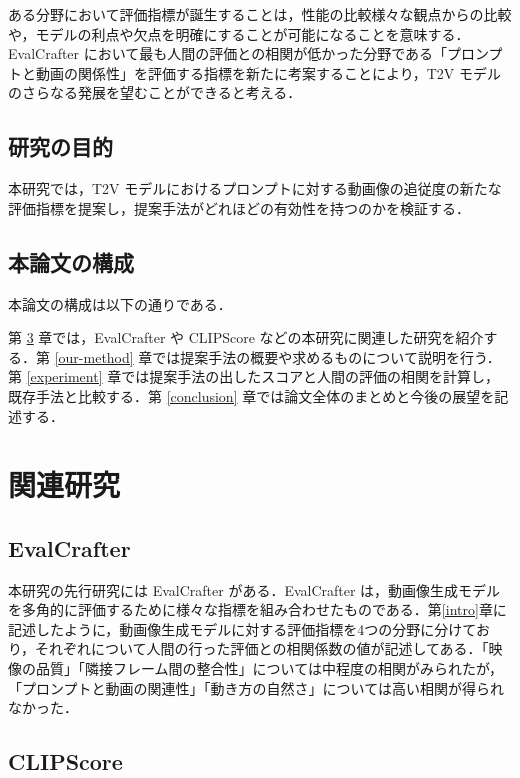 \documentclass[11pt,a4j]{jreport}
\begin{document}
ある分野において評価指標が誕生することは，性能の比較様々な観点からの比較や，モデルの利点や欠点を明確にすることが可能になることを意味する．EvalCrafter において最も人間の評価との相関が低かった分野である「プロンプトと動画の関係性」を評価する指標を新たに考案することにより，T2V モデルのさらなる発展を望むことができると考える．

\section{研究の目的}

本研究では，T2V モデルにおけるプロンプトに対する動画像の追従度の新たな評価指標を提案し，提案手法がどれほどの有効性を持つのかを検証する．

\section{本論文の構成}
本論文の構成は以下の通りである．

第 \ref{related-works} 章では，EvalCrafter や CLIPScore などの本研究に関連した研究を紹介する．第 \ref{our-method} 章では提案手法の概要や求めるものについて説明を行う．第 \ref{experiment} 章では提案手法の出したスコアと人間の評価の相関を計算し，既存手法と比較する．第 \ref{conclusion} 章では論文全体のまとめと今後の展望を記述する．

\chapter{関連研究}
\label{related-works}
\section{EvalCrafter}
\label{sec:evalcrafter}

本研究の先行研究には EvalCrafter \cite{liu2023evalcrafter} がある．EvalCrafter は，動画像生成モデルを多角的に評価するために様々な指標を組み合わせたものである．第\ref{intro}章に記述したように，動画像生成モデルに対する評価指標を4つの分野に分けており，それぞれについて人間の行った評価との相関係数の値が記述してある．「映像の品質」「隣接フレーム間の整合性」については中程度の相関がみられたが，「プロンプトと動画の関連性」「動き方の自然さ」については高い相関が得られなかった．

\section{CLIPScore}
\label{sec:clipscore}
\end{document}

